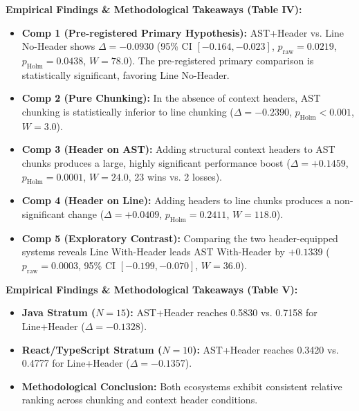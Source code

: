 \documentclass[11pt,a4paper,landscape]{article}
\begin{document}

\FloatBarrier
\vspace{-0.1cm}
{\small
\noindent\textbf{Empirical Findings \& Methodological Takeaways (Table IV):}
\begin{itemize}[nosep,topsep=2pt,partopsep=0pt,itemsep=2pt]
    \item \textbf{Comp 1 (Pre-registered Primary Hypothesis):} AST+Header vs. Line No-Header shows $\Delta = -0.0930$ (95\% CI $[-0.164, -0.023]$, $p_{\mathrm{raw}} = 0.0219$, $p_{\mathrm{Holm}} = 0.0438$, $W = 78.0$). The pre-registered primary comparison is statistically significant, favoring Line No-Header.
    \item \textbf{Comp 2 (Pure Chunking):} In the absence of context headers, AST chunking is statistically inferior to line chunking ($\Delta = -0.2390$, $p_{\mathrm{Holm}} < 0.001$, $W = 3.0$).
    \item \textbf{Comp 3 (Header on AST):} Adding structural context headers to AST chunks produces a large, highly significant performance boost ($\Delta = +0.1459$, $p_{\mathrm{Holm}} = 0.0001$, $W = 24.0$, 23 wins vs. 2 losses).
    \item \textbf{Comp 4 (Header on Line):} Adding headers to line chunks produces a non-significant change ($\Delta = +0.0409$, $p_{\mathrm{Holm}} = 0.2411$, $W = 118.0$).
    \item \textbf{Comp 5 (Exploratory Contrast):} Comparing the two header-equipped systems reveals Line With-Header leads AST With-Header by $+0.1339$ ($p_{\mathrm{raw}} = 0.0003$, 95\% CI $[-0.199, -0.070]$, $W = 36.0$).
\end{itemize}
}
\clearpage


\FloatBarrier
\vspace{-0.1cm}
{\small
\noindent\textbf{Empirical Findings \& Methodological Takeaways (Table V):}
\begin{itemize}[nosep,topsep=2pt,partopsep=0pt,itemsep=2pt]
    \item \textbf{Java Stratum ($N=15$):} AST+Header reaches 0.5830 vs. 0.7158 for Line+Header ($\Delta = -0.1328$).
    \item \textbf{React/TypeScript Stratum ($N=10$):} AST+Header reaches 0.3420 vs. 0.4777 for Line+Header ($\Delta = -0.1357$).
    \item \textbf{Methodological Conclusion:} Both ecosystems exhibit consistent relative ranking across chunking and context header conditions.
\end{itemize}
}
\clearpage
\end{document}
